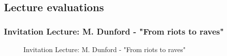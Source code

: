 \documentclass[11pt,a4paper]{article}
\numberwithin{equation}{section}
\numberwithin{table}{section}\setlength{\multlinegap}{25pt}
\begin{document}
\subsection{Lecture evaluations}

\subsubsection{Invitation Lecture: M. Dunford  - "From riots to raves"}

\begin{figure}[H]
\centering
\null\hfill %
\hfill %
\hfill %
\hfill %
\hfill\null %
\caption{Invitation Lecture: M. Dunford - "From riots to raves"}
\end{figure} 
\end{document}
